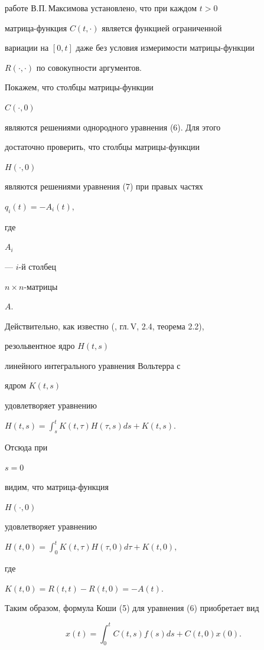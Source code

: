 работе В.П.\,Максимова \cite{Mak1} установлено, что при каждом $t >0$


матрица-функция $C(t,\cdot)$ является функцией ограниченной


вариации на $[0,t]$ даже без условия измеримости матрицы-функции


$R(\cdot,\cdot)$ по совокупности аргументов.





Покажем, что столбцы матрицы-функции


$C(\cdot,0)$


являются решениями однородного уравнения (6). Для этого


достаточно проверить, что столбцы матрицы-функции


$H(\cdot,0)$


являются решениями уравнения (7) при правых частях


$q_i(t) = - A_i(t),$


где


$A_i$


--- $i$-й столбец


$n\times n$-матрицы


$A.$





Действительно, как известно (\cite{Zab}, гл.\,V, 2.4, теорема 2.2),


резольвентное ядро $H(t,s)$


линейного интегрального уравнения Вольтерра с


ядром $K(t,s)$


удовлетворяет уравнению


$H(t,s) = \int_s^t K(t,\tau) H(\tau, s) ds + K(t,s).$


Отсюда при


$s=0$


видим, что матрица-функция


$H(\cdot, 0)$


удовлетворяет уравнению


$H(t,0) = \int_0^t K(t,\tau)H(\tau,0)d\tau + K(t,0),$


где


$K(t,0) = R(t,t) - R(t,0) = - A(t).$





Таким образом, формула Коши (5) для уравнения (6) приобретает вид


\begin{equation}


x(t) = \int_0^t C(t,s)f(s)ds + C(t,0) x(0).


\end{equation}





